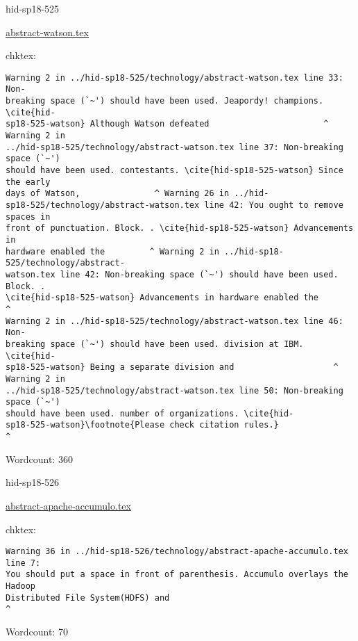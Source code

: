 

\begin{IU}

hid-sp18-525

\href{https://github.com/cloudmesh-community/hid-sp18-525/blob/master//technology/abstract-watson.tex}{abstract-watson.tex}

 
chktex:
\begin{tiny}
\begin{verbatim}
Warning 2 in ../hid-sp18-525/technology/abstract-watson.tex line 33: Non-
breaking space (`~') should have been used. Jeapordy! champions. \cite{hid-
sp18-525-watson} Although Watson defeated                       ^ Warning 2 in
../hid-sp18-525/technology/abstract-watson.tex line 37: Non-breaking space (`~')
should have been used. contestants. \cite{hid-sp18-525-watson} Since the early
days of Watson,               ^ Warning 26 in ../hid-
sp18-525/technology/abstract-watson.tex line 42: You ought to remove spaces in
front of punctuation. Block. . \cite{hid-sp18-525-watson} Advancements in
hardware enabled the         ^ Warning 2 in ../hid-sp18-525/technology/abstract-
watson.tex line 42: Non-breaking space (`~') should have been used. Block. .
\cite{hid-sp18-525-watson} Advancements in hardware enabled the           ^
Warning 2 in ../hid-sp18-525/technology/abstract-watson.tex line 46: Non-
breaking space (`~') should have been used. division at IBM.  \cite{hid-
sp18-525-watson} Being a separate division and                    ^ Warning 2 in
../hid-sp18-525/technology/abstract-watson.tex line 50: Non-breaking space (`~')
should have been used. number of organizations. \cite{hid-
sp18-525-watson}\footnote{Please check citation rules.}
^
\end{verbatim}
\end{tiny}

Wordcount: 360

\end{IU}



\begin{IU}

hid-sp18-526

\href{https://github.com/cloudmesh-community/hid-sp18-526/blob/master//technology/abstract-apache-accumulo.tex}{abstract-apache-accumulo.tex}

 
chktex:
\begin{tiny}
\begin{verbatim}
Warning 36 in ../hid-sp18-526/technology/abstract-apache-accumulo.tex line 7:
You should put a space in front of parenthesis. Accumulo overlays the Hadoop
Distributed File System(HDFS) and
^
\end{verbatim}
\end{tiny}

Wordcount: 70

\end{IU}

